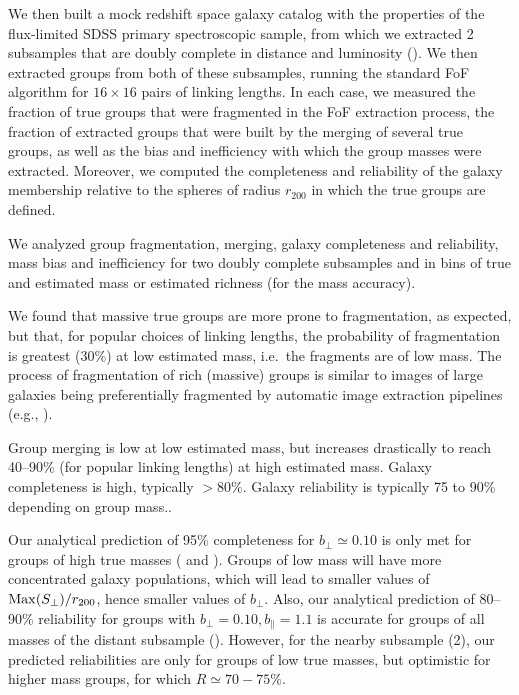 We then built a mock redshift space galaxy catalog with the properties of the
flux-limited SDSS primary spectroscopic sample, from which we extracted 2
subsamples that are doubly complete in distance and luminosity
(). We then extracted groups from both of these
subsamples, running the standard FoF algorithm for $16\times16$ pairs of
linking lengths.  In each case, we measured the fraction of true groups that
were fragmented in the FoF extraction process, the fraction of extracted groups
that were built by the merging of several true groups, as well as the bias and
inefficiency with which the group masses were extracted. Moreover, we computed
the completeness and reliability of the galaxy membership relative to the
spheres of radius $r_{200}$ in which the true groups are defined.

We analyzed group fragmentation, merging, galaxy completeness and reliability,
mass bias and inefficiency for two doubly complete subsamples and in bins of
true and estimated mass or estimated richness (for the mass accuracy).

We found that massive true groups are more prone to fragmentation, as expected,
but that, for popular choices of linking lengths, the probability of
fragmentation is greatest (30\%) at low estimated mass, i.e.\ the fragments are
of low mass. The process of fragmentation of rich (massive) groups  is similar
to images of large galaxies being preferentially fragmented by automatic image
extraction pipelines (e.g., \citealp{DePropris+07}).

Group merging is low at low estimated mass, but increases drastically to reach
40--90\% (for popular linking lengths) at high estimated mass. Galaxy
completeness is high, typically $>80\%$. Galaxy reliability is typically 75 to
90\% depending on group mass..

Our analytical prediction of 95\% completeness for $b_\perp\simeq 0.10$ is only
met for groups of high true masses ( and
). Groups of low mass will have more concentrated
galaxy populations, which will lead to smaller values of ${\rm
Max}(S_\perp)/r_{200}$, hence smaller values of $b_\perp$. Also, our analytical
prediction of 80--90\% reliability for groups with $b_\perp=0.10,
b_\parallel=1.1$ is accurate for groups of all masses of the distant subsample
(). However, for the nearby subsample (2), our
predicted reliabilities are only  for groups of low true
masses, but optimistic for higher mass groups, for which $R \simeq 70-75\%$.

